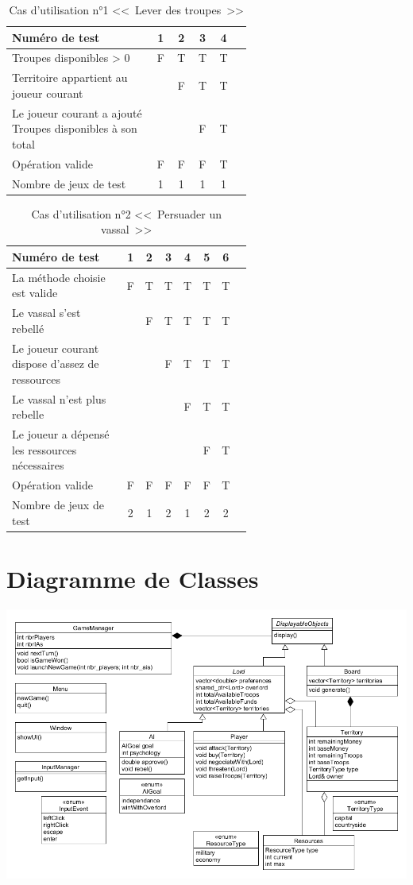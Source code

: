 \documentclass[12pt,a4paper]{article}
\begin{document}
\begin{table}[htbp!]
\begin{tabular}{|p{0.6\linewidth}|c|c|c|c|c|}
\hline 
Numéro de test
&1&2&3&4\\ 
\hline 
\hline
Troupes disponibles > 0
&F&T&T&T\\ 
\hline
Territoire appartient au joueur courant
& &F&T&T\\
\hline
\hline
Le joueur courant a ajouté Troupes disponibles à son total
& & &F&T\\
\hline
\hline
Opération valide
&F&F&F&T\\
\hline
Nombre de jeux de test
&1&1&1&1\\
\hline 
\end{tabular} 
\caption{Cas d'utilisation n°1 <<~Lever des troupes~>>}
\end{table}

\begin{table}[htbp!]
\begin{tabular}{|p{0.6\linewidth}|c|c|c|c|c|c|c|}
\hline 
Numéro de test
&1&2&3&4&5&6\\ 
\hline 
\hline
La méthode choisie est valide
&F&T&T&T&T&T\\ 
\hline
Le vassal s'est rebellé
& &F&T&T&T&T\\
\hline
Le joueur courant dispose d'assez de ressources
& & &F&T&T&T\\
\hline
\hline
Le vassal n'est plus rebelle
& & & &F&T&T\\
\hline
Le joueur a dépensé les ressources nécessaires
& & & & &F&T\\
\hline
\hline
Opération valide
&F&F&F&F&F&T\\
\hline
Nombre de jeux de test
&2&1&2&1&2&2\\
\hline 
\end{tabular} 
\caption{Cas d'utilisation n°2 <<~Persuader un vassal~>>}
\end{table}

\newpage

\section{Diagramme de Classes}

\includegraphics[scale=0.5]{Diagramme_Classes/diagramme_classes.png} 
\end{document}

